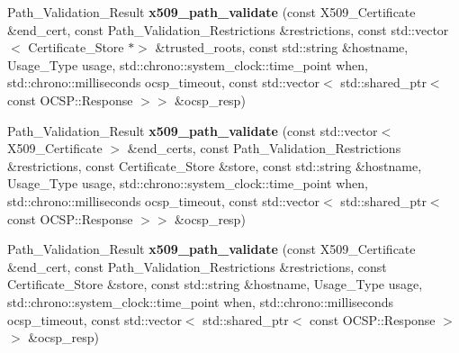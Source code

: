 \begin{DoxyCompactItemize}
\item 
\mbox{\label{namespace_botan_a1a5cd06ae0154e1819f39a5a38a9af78}} 
Path\+\_\+\+Validation\+\_\+\+Result {\bfseries x509\+\_\+path\+\_\+validate} (const X509\+\_\+\+Certificate \&end\+\_\+cert, const Path\+\_\+\+Validation\+\_\+\+Restrictions \&restrictions, const std\+::vector$<$ Certificate\+\_\+\+Store $\ast$$>$ \&trusted\+\_\+roots, const std\+::string \&hostname, Usage\+\_\+\+Type usage, std\+::chrono\+::system\+\_\+clock\+::time\+\_\+point when, std\+::chrono\+::milliseconds ocsp\+\_\+timeout, const std\+::vector$<$ std\+::shared\+\_\+ptr$<$ const O\+C\+S\+P\+::\+Response $>$$>$ \&ocsp\+\_\+resp)
\item 
\mbox{\label{namespace_botan_a1cd1afc7ba4b8847eaf28b6da13fce5e}} 
Path\+\_\+\+Validation\+\_\+\+Result {\bfseries x509\+\_\+path\+\_\+validate} (const std\+::vector$<$ X509\+\_\+\+Certificate $>$ \&end\+\_\+certs, const Path\+\_\+\+Validation\+\_\+\+Restrictions \&restrictions, const Certificate\+\_\+\+Store \&store, const std\+::string \&hostname, Usage\+\_\+\+Type usage, std\+::chrono\+::system\+\_\+clock\+::time\+\_\+point when, std\+::chrono\+::milliseconds ocsp\+\_\+timeout, const std\+::vector$<$ std\+::shared\+\_\+ptr$<$ const O\+C\+S\+P\+::\+Response $>$$>$ \&ocsp\+\_\+resp)
\item 
\mbox{\label{namespace_botan_a047a8a97bebded357efb00ccbb917539}} 
Path\+\_\+\+Validation\+\_\+\+Result {\bfseries x509\+\_\+path\+\_\+validate} (const X509\+\_\+\+Certificate \&end\+\_\+cert, const Path\+\_\+\+Validation\+\_\+\+Restrictions \&restrictions, const Certificate\+\_\+\+Store \&store, const std\+::string \&hostname, Usage\+\_\+\+Type usage, std\+::chrono\+::system\+\_\+clock\+::time\+\_\+point when, std\+::chrono\+::milliseconds ocsp\+\_\+timeout, const std\+::vector$<$ std\+::shared\+\_\+ptr$<$ const O\+C\+S\+P\+::\+Response $>$$>$ \&ocsp\+\_\+resp)
\end{DoxyCompactItemize}
